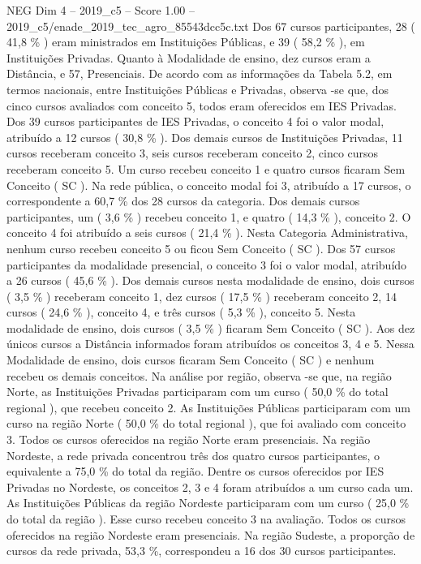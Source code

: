 \begin{textsample}{NEG Dim 4 – 2019\_c5 – Score 1.00 – 2019\_c5/enade\_2019\_tec\_agro\_85543dcc5c.txt}
Dos 67 cursos participantes, 28 ( 41,8 \% ) eram ministrados em Instituições Públicas, e 39 ( 58,2 \% ), em Instituições Privadas.
Quanto à Modalidade de ensino, dez cursos eram a Distância, e 57, Presenciais.
De acordo com as informações da Tabela 5.2, em termos nacionais, entre Instituições Públicas e Privadas, observa -se que, dos cinco cursos avaliados com conceito 5, todos eram oferecidos em IES Privadas.
Dos 39 cursos participantes de IES Privadas, o conceito 4 foi o valor modal, atribuído a 12 cursos ( 30,8 \% ).
Dos demais cursos de Instituições Privadas, 11 cursos receberam conceito 3, seis cursos receberam conceito 2, cinco cursos receberam conceito 5.
Um curso recebeu conceito 1 e quatro cursos ficaram Sem Conceito ( SC ).
Na rede pública, o conceito modal foi 3, atribuído a 17 cursos, o correspondente a 60,7 \% dos 28 cursos da categoria.
Dos demais cursos participantes, um ( 3,6 \% ) recebeu conceito 1, e quatro ( 14,3 \% ), conceito 2.
O conceito 4 foi atribuído a seis cursos ( 21,4 \% ).
Nesta Categoria Administrativa, nenhum curso recebeu conceito 5 ou ficou Sem Conceito ( SC ).
Dos 57 cursos participantes da modalidade presencial, o conceito 3 foi o valor modal, atribuído a 26 cursos ( 45,6 \% ).
Dos demais cursos nesta modalidade de ensino, dois cursos ( 3,5 \% ) receberam conceito 1, dez cursos ( 17,5 \% ) receberam conceito 2, 14 cursos ( 24,6 \% ), conceito 4, e três cursos ( 5,3 \% ), conceito 5.
Nesta modalidade de ensino, dois cursos ( 3,5 \% ) ficaram Sem Conceito ( SC ).
Aos dez únicos cursos a Distância informados foram atribuídos os conceitos 3, 4 e 5.
Nessa Modalidade de ensino, dois cursos ficaram Sem Conceito ( SC ) e nenhum recebeu os demais conceitos.
Na análise por região, observa -se que, na região Norte, as Instituições Privadas participaram com um curso ( 50,0 \% do total regional ), que recebeu conceito 2.
As Instituições Públicas participaram com um curso na região Norte ( 50,0 \% do total regional ), que foi avaliado com conceito 3.
Todos os cursos oferecidos na região Norte eram presenciais.
Na região Nordeste, a rede privada concentrou três dos quatro cursos participantes, o equivalente a 75,0 \% do total da região.
Dentre os cursos oferecidos por IES Privadas no Nordeste, os conceitos 2, 3 e 4 foram atribuídos a um curso cada um.
As Instituições Públicas da região Nordeste participaram com um curso ( 25,0 \% do total da região ).
Esse curso recebeu conceito 3 na avaliação.
Todos os cursos oferecidos na região Nordeste eram presenciais.
Na região Sudeste, a proporção de cursos da rede privada, 53,3 \%, correspondeu a 16 dos 30 cursos participantes.

\end{textsample}

